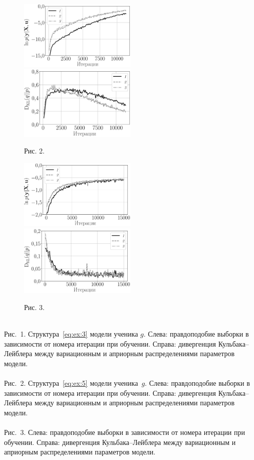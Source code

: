 \documentclass[12pt]{a&t}
\begin{document}
\begin{figure}[h!]
\includegraphics[width=0.5\textwidth]{synthetic_likelihood_2_layers.eps}
\includegraphics[width=0.5\textwidth]{synthetic_D_KL_2_layers.eps}
\caption{Рис. 2.}
\label{exp:fig2}
\end{figure}

\begin{figure}[h!]
\includegraphics[width=0.5\textwidth]{fashionmnist_likelihood_2_layers.eps}
\includegraphics[width=0.5\textwidth]{fashionmnist_D_KL_2_layers.eps}
\caption{Рис. 3.}
\label{exp:fig3}
\end{figure}

\newpage
~\\
Рис.~1. Структура~\eqref{eq:ex:3} модели ученика $g$. Слева: правдоподобие выборки в зависимости от номера итерации при обучении. Справа: дивергенция Кульбака--Лейблера между вариационным и априорным распределениями параметров модели.
\\~\\
Рис.~2. Структура~\eqref{eq:ex:5} модели ученика~$g$. Слева: правдоподобие выборки в зависимости от номера итерации при обучении. Справа: дивергенция Кульбака--Лейблера между вариационным и априорным распределениями параметров модели.
\\~\\
Рис.~3. Слева: правдоподобие выборки в зависимости от номера итерации при обучении. Справа: дивергенция Кульбака--Лейблера между вариационным и априорным распределениями параметров модели.
\end{document}
